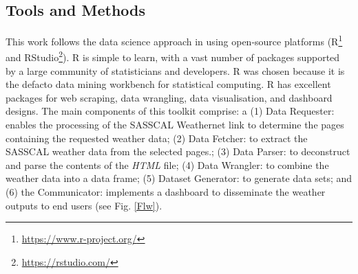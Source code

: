 \documentclass[a4paper, 10pt, conference]{ieeeconf}      %
\begin{document}
\subsection{Tools and Methods}
\noindent
 This work follows  the data science approach in \cite{wickham2016r,bradley2019web}  %
 using open-source platforms (R\footnote{\url{https://www.r-project.org/}} and RStudio\footnote{\url{https://rstudio.com/}}). %
 R is simple to learn, with a vast number of packages supported by a large community of statisticians and developers. R was chosen because it is the defacto data mining workbench for statistical computing. R has excellent packages for web scraping, data wrangling, data visualisation, and dashboard designs. %
The main components of this toolkit comprise: a (1) Data Requester: enables the processing of the SASSCAL Weathernet link to  determine the pages containing the requested weather data; (2) Data Fetcher: to extract the SASSCAL weather data from the selected pages.; (3) Data Parser: to deconstruct and parse the contents of the \emph{HTML} file; (4) Data Wrangler: to combine the weather data into a  data frame; (5)  Dataset Generator: to generate  data sets; and  (6) the Communicator: implements  a dashboard  to disseminate the weather outputs to end users (see Fig. \ref{Flw}).  
\end{document}
